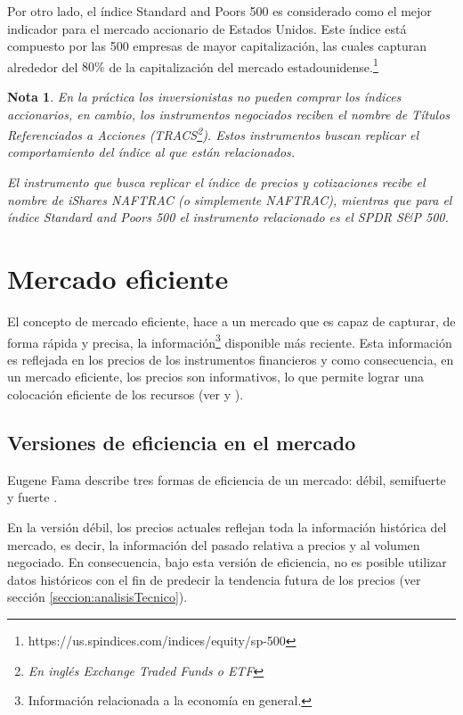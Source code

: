 \documentclass[12pt]{report}
\theoremstyle{break}
\newtheorem{nota}{Nota}[chapter]
\theoremstyle{break}
\begin{document}
Por otro lado, el índice Standard and Poors 500 es considerado como el mejor indicador para el mercado accionario de Estados Unidos. Este índice está compuesto por las 500 empresas de mayor capitalización, las cuales capturan alrededor del $80\%$ de la capitalización del mercado estadounidense.\footnote{https://us.spindices.com/indices/equity/sp-500}

\begin{nota} \label{nota:ETF}
En la práctica los inversionistas no pueden comprar los índices accionarios, en cambio, los instrumentos negociados reciben el nombre de Títulos Referenciados a Acciones (TRACS\footnote{En inglés Exchange Traded Funds o ETF}). Estos instrumentos buscan replicar el comportamiento del índice al que están relacionados.

El instrumento que busca replicar el índice de precios y cotizaciones recibe el nombre de iShares NAFTRAC (o simplemente NAFTRAC), mientras que para el índice Standard and Poors 500 el instrumento relacionado es el SPDR S\&P 500.
\end{nota}

\section{Mercado eficiente}
\label{seccion:mercado eficiente}
El concepto de mercado eficiente, hace a un mercado que es capaz de capturar, de forma rápida y precisa, la información\footnote{Información relacionada a la economía en general.} disponible más reciente. Esta información es reflejada en los precios de los instrumentos financieros y como consecuencia, en un mercado eficiente, los precios son informativos, lo que permite lograr una colocación eficiente de los recursos (ver \cite{Fama1965} y \cite{CFA2019}).

\subsection{Versiones de eficiencia en el mercado}
\label{subseccion:versiones emh}
Eugene Fama describe tres formas de eficiencia de un mercado: débil, semifuerte y fuerte \cite{Fama1965}.

En la versión débil, los precios actuales reflejan toda la información histórica del mercado, es decir, la información del pasado relativa a precios y al volumen negociado. En consecuencia, bajo esta versión de eficiencia, no es posible utilizar datos históricos con el fin de predecir la tendencia futura de los precios (ver sección \ref{seccion:analisisTecnico}).
\end{document}
